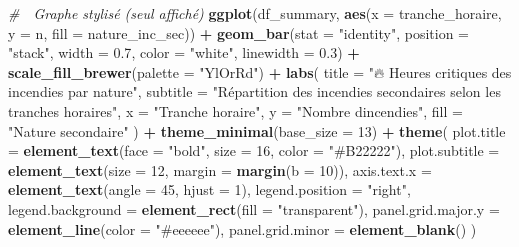 \documentclass[
]{article}
\newenvironment{Shaded}{\begin{snugshade}}{\end{snugshade}}
\newcommand{\AttributeTok}[1]{\textcolor[rgb]{0.13,0.29,0.53}{#1}}
\newcommand{\CommentTok}[1]{\textcolor[rgb]{0.56,0.35,0.01}{\textit{#1}}}
\newcommand{\DecValTok}[1]{\textcolor[rgb]{0.00,0.00,0.81}{#1}}
\newcommand{\FloatTok}[1]{\textcolor[rgb]{0.00,0.00,0.81}{#1}}
\newcommand{\FunctionTok}[1]{\textcolor[rgb]{0.13,0.29,0.53}{\textbf{#1}}}
\newcommand{\NormalTok}[1]{#1}
\newcommand{\SpecialCharTok}[1]{\textcolor[rgb]{0.81,0.36,0.00}{\textbf{#1}}}
\newcommand{\StringTok}[1]{\textcolor[rgb]{0.31,0.60,0.02}{#1}}
\begin{document}
\begin{Shaded}
\begin{Highlighting}[]
\CommentTok{\# 💅 Graphe stylisé (seul affiché)}
\FunctionTok{ggplot}\NormalTok{(df\_summary, }\FunctionTok{aes}\NormalTok{(}\AttributeTok{x =}\NormalTok{ tranche\_horaire, }\AttributeTok{y =}\NormalTok{ n, }\AttributeTok{fill =}\NormalTok{ nature\_inc\_sec)) }\SpecialCharTok{+}
  \FunctionTok{geom\_bar}\NormalTok{(}\AttributeTok{stat =} \StringTok{"identity"}\NormalTok{, }\AttributeTok{position =} \StringTok{"stack"}\NormalTok{, }\AttributeTok{width =} \FloatTok{0.7}\NormalTok{, }\AttributeTok{color =} \StringTok{"white"}\NormalTok{, }\AttributeTok{linewidth =} \FloatTok{0.3}\NormalTok{) }\SpecialCharTok{+}
  \FunctionTok{scale\_fill\_brewer}\NormalTok{(}\AttributeTok{palette =} \StringTok{"YlOrRd"}\NormalTok{) }\SpecialCharTok{+}
  \FunctionTok{labs}\NormalTok{(}
    \AttributeTok{title =} \StringTok{"🔥 Heures critiques des incendies par nature"}\NormalTok{,}
    \AttributeTok{subtitle =} \StringTok{"Répartition des incendies secondaires selon les tranches horaires"}\NormalTok{,}
    \AttributeTok{x =} \StringTok{"Tranche horaire"}\NormalTok{,}
    \AttributeTok{y =} \StringTok{"Nombre d\textquotesingle{}incendies"}\NormalTok{,}
    \AttributeTok{fill =} \StringTok{"Nature secondaire"}
\NormalTok{  ) }\SpecialCharTok{+}
  \FunctionTok{theme\_minimal}\NormalTok{(}\AttributeTok{base\_size =} \DecValTok{13}\NormalTok{) }\SpecialCharTok{+}
  \FunctionTok{theme}\NormalTok{(}
    \AttributeTok{plot.title =} \FunctionTok{element\_text}\NormalTok{(}\AttributeTok{face =} \StringTok{"bold"}\NormalTok{, }\AttributeTok{size =} \DecValTok{16}\NormalTok{, }\AttributeTok{color =} \StringTok{"\#B22222"}\NormalTok{),}
    \AttributeTok{plot.subtitle =} \FunctionTok{element\_text}\NormalTok{(}\AttributeTok{size =} \DecValTok{12}\NormalTok{, }\AttributeTok{margin =} \FunctionTok{margin}\NormalTok{(}\AttributeTok{b =} \DecValTok{10}\NormalTok{)),}
    \AttributeTok{axis.text.x =} \FunctionTok{element\_text}\NormalTok{(}\AttributeTok{angle =} \DecValTok{45}\NormalTok{, }\AttributeTok{hjust =} \DecValTok{1}\NormalTok{),}
    \AttributeTok{legend.position =} \StringTok{"right"}\NormalTok{,}
    \AttributeTok{legend.background =} \FunctionTok{element\_rect}\NormalTok{(}\AttributeTok{fill =} \StringTok{"transparent"}\NormalTok{),}
    \AttributeTok{panel.grid.major.y =} \FunctionTok{element\_line}\NormalTok{(}\AttributeTok{color =} \StringTok{"\#eeeeee"}\NormalTok{),}
    \AttributeTok{panel.grid.minor =} \FunctionTok{element\_blank}\NormalTok{()}
\NormalTok{  )}
\end{Highlighting}
\end{Shaded}
\end{document}
